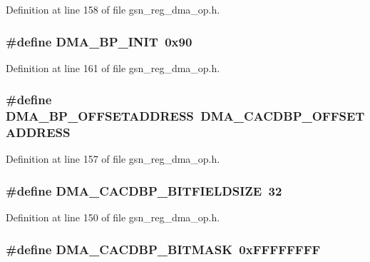 Definition at line 158 of file gsn\_\-reg\_\-dma\_\-op.h.

\hypertarget{a00547_aff9cdfce242a1dea85c03a03280b1490}{
\subsubsection[{DMA\_\-BP\_\-INIT}]{\setlength{\rightskip}{0pt plus 5cm}\#define DMA\_\-BP\_\-INIT~0x90}}
\label{a00547_aff9cdfce242a1dea85c03a03280b1490}


Definition at line 161 of file gsn\_\-reg\_\-dma\_\-op.h.

\hypertarget{a00547_aa3a17523e030ad7528d006fea3a92fad}{
\subsubsection[{DMA\_\-BP\_\-OFFSETADDRESS}]{\setlength{\rightskip}{0pt plus 5cm}\#define DMA\_\-BP\_\-OFFSETADDRESS~DMA\_\-CACDBP\_\-OFFSETADDRESS}}
\label{a00547_aa3a17523e030ad7528d006fea3a92fad}


Definition at line 157 of file gsn\_\-reg\_\-dma\_\-op.h.

\hypertarget{a00547_adc7f51f4243fb65d2a8e4c449743c5d3}{
\subsubsection[{DMA\_\-CACDBP\_\-BITFIELDSIZE}]{\setlength{\rightskip}{0pt plus 5cm}\#define DMA\_\-CACDBP\_\-BITFIELDSIZE~32}}
\label{a00547_adc7f51f4243fb65d2a8e4c449743c5d3}


Definition at line 150 of file gsn\_\-reg\_\-dma\_\-op.h.

\hypertarget{a00547_a03df02dd206bb041d832f9cbad038bc0}{
\subsubsection[{DMA\_\-CACDBP\_\-BITMASK}]{\setlength{\rightskip}{0pt plus 5cm}\#define DMA\_\-CACDBP\_\-BITMASK~0xFFFFFFFF}}
\label{a00547_a03df02dd206bb041d832f9cbad038bc0}


